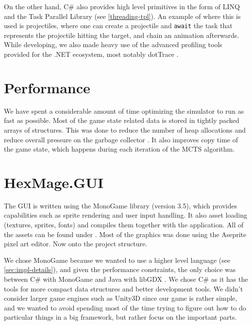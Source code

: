 On the other hand, C\# also provides high level primitives in the form of LINQ and the Task Parallel Library \citep{tpl} (see \autoref{threading-tpl}). An example of where this is used is projectiles, where one can create a projectile and \verb|await| the task that represents the projectile hitting the target, and chain an animation afterwards. While developing, we also made heavy use of the advanced profiling tools provided for the .NET ecosystem, most notably dotTrace \citep{dot-trace}.

\section{Performance}

We have spent a considerable amount of time optimizing the simulator to run as fast as possible. Most of the game state related data is stored in tightly packed arrays of structures. This was done to reduce the number of heap allocations and reduce overall pressure on the garbage collector \citep{highperf-dotnet}. It also improves copy time of the game state, which happens during each iteration of the MCTS algorithm.



\section{HexMage.GUI}


The GUI is written using the MonoGame \citep{monogame} library (version 3.5), which provides capabilities such as sprite rendering and user input handling. It also asset loading (textures, sprites, fonts) and compiles them together with the application. All of the assets can be found under . Most of the graphics was done using the Aseprite \citep{aseprite} pixel art editor. Now onto the project structure.

We chose MonoGame because we wanted to use a higher level language (see \autoref{sec:impl-details}), and given the performance constraints, the only choice was between C\# with MonoGame and Java with libGDX \citep{libgdx}. We chose C\# as it has the tools for more compact data structures and better development tools. We didn't consider larger game engines such as Unity3D \citep{unity3d} since our game is rather simple, and we wanted to avoid spending most of the time trying to figure out how to do particular things in a big framework, but rather focus on the important parts.

